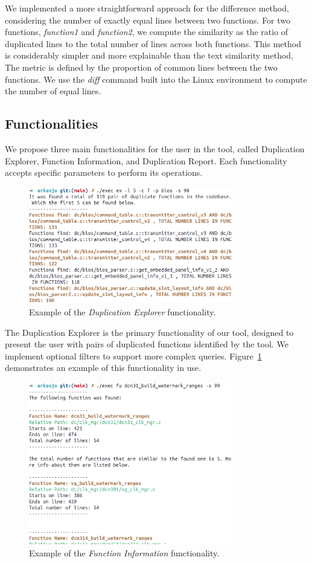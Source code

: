 \documentclass[conference]{IEEEtran}
\begin{document}
We implemented a more straightforward approach for the difference method,
considering the number of exactly equal lines between two functions.
For two functions, \textit{function1} and \textit{function2}, we compute the similarity as the 
ratio of duplicated lines to the total number of lines across both functions.
This method is considerably simpler and more explainable than the text similarity method, 
The metric is defined by the proportion of common lines between the two functions. 
We use the \textit{diff} command built into the Linux environment to compute the number of equal lines.

\subsection{Functionalities}

We propose three main functionalities for the user in the tool, called Duplication
Explorer, Function Information, and Duplication Report. Each functionality accepts
specific parameters to perform its operations.

\begin{figure}[ht]
\centering
\includegraphics[width=3.5in]{fig/explorer_example.png}
\caption{Example of the \textit{Duplication Explorer} functionality.}
\label{fig:explorer_ex}
\end{figure}

The Duplication Explorer is the primary functionality of our tool, designed to present
the user with pairs of duplicated functions identified by the tool. We implement optional
filters to support more complex queries. Figure~\ref{fig:explorer_ex}
demonstrates an example of this functionality in use.


\begin{figure}[ht]
\centering
\includegraphics[width=3.5in]{fig/function_example.png}
\caption{Example of the \textit{Function Information} functionality.}
\label{fig:function_ex}
\end{figure}
\end{document}
